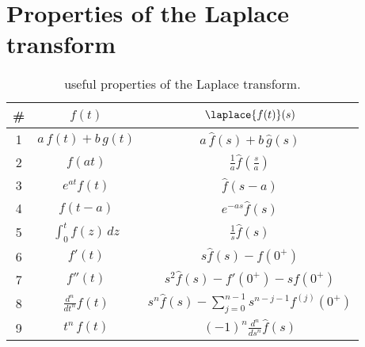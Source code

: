 \section{Properties of the Laplace transform}
	
	\begin{table}[bht]
	\centering
	\begin{tabular}{c |c |c}
		\# & $f(t)$ & $\laplace{f(t)}(s)$ \\ \hline
		1 & $a\, f(t) + b \, g(t)$ & $a \, \hat f(s) + b \, \hat g(s)$ \\ 
		2 & $f(at)$ & $\frac 1 a \hat f\left(\frac s a\right)$ \\
		3 & $e^{at}f(t)$ & $\hat f(s-a)$ \\
		4 & $f(t-a)$ & $e^{-as} \hat f(s)$ \\
		5 & $\int_0^t f(z)\, dz$ & $\frac 1 s \hat f(s)$ \\
		6 & $f'(t)$ & $s \hat f(s) - f(0^+)$ \\
		7 & $f''(t)$ & $s^2 \hat f(s) - f'(0^+) - s f(0^+)$ \\
		8 & $\frac {d^n}{dt^n}f(t)$ & $s^n \hat f(s) - \sum_{j=0}^{n-1} s^{n-j-1} f^{(j)}(0^+) $ \\
		9 & $t^n \, f(t)$ & $(-1)^n \frac{d^n}{ds^n} \hat f(s)$
	\end{tabular}
	\caption{useful properties of the Laplace transform.} \label{app:lap:properties}
	\end{table}

